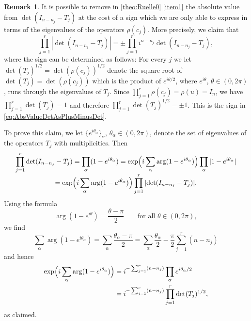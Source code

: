 \documentclass[10pt]{amsart}
\theoremstyle{plain}
\theoremstyle{definition}
\newtheorem{rmrk}[thm]{Remark}
\theoremstyle{remark}
\numberwithin{equation}{section}
\begin{document}
\begin{rmrk}\label{rmk:SignInM=0Formula}
It is possible to remove in \cref{theo:Ruelle0} \cref{item1} the absolute value from $\det(I_{n-n_j}-T_j)$ at the cost of a sign which we are only able to express in terms of the eigenvalues of the operators $\rho(c_j)$. More precisely, we claim that
\begin{equation}
\prod_{j=1}^r|{\det}(I_{n-n_j}-T_j)| = \pm\prod_{j=1}^r i^{n-n_j}\det(I_{n-n_j}-T_j),\label{eq:AbsValueDetAsPlusMinusDet}
\end{equation}
where the sign can be determined as follows: For every $j$ we let $\det(T_j)^{1/2}=\det(\rho(c_j))^{1/2}$ denote the square root of $\det(T_j)=\det(\rho(c_j))$ which is the product of $e^{i\theta/2}$, where $e^{i\theta}$, $\theta\in(0,2\pi)$, runs through the eigenvalues of $T_j$. Since $\prod_{j=1}^r\rho(c_j)=\rho(u)=I_n$, we have $\prod_{j=1}^r\det(T_j)=1$ and therefore $\prod_{j=1}^r\det(T_j)^{1/2}=\pm1$. This is the sign in \cref{eq:AbsValueDetAsPlusMinusDet}.

To prove this claim, we let $\{e^{i\theta_\alpha}\}_\alpha$, $\theta_\alpha\in(0,2\pi)$, denote the set of eigenvalues of the operators $T_j$ with multiplicities. Then\vspace*{-3pt}
\begin{multline*}
\prod_{j=1}^r\det(I_{n-n_j}-T_j) = \prod_\alpha(1-e^{i\theta_\alpha}) = \exp\Bigl(i\sum_\alpha\arg(1-e^{i\theta_\alpha})\Bigr)\prod_\alpha|1-e^{i\theta_\alpha}|\\[-3pt]
= \exp\Bigl(i\sum_\alpha\arg(1-e^{i\theta_\alpha})\Bigr)\prod_{j=1}^r|{\det}(I_{n-n_j}-T_j)|.
\end{multline*}
Using the formula\vspace*{-3pt}
\begin{equation}
\arg(1-e^{i\theta}) = \frac{\theta-\pi}{2} \qquad \mbox{for all }\theta\in(0,2\pi),\label{eq:FormulaForArgument1MinusZ}
\end{equation}
we find\vspace*{-3pt}
\[
\sum_\alpha\arg(1-e^{i\theta_\alpha}) = \sum_\alpha\frac{\theta_\alpha-\pi}{2} = \sum_\alpha\frac{\theta_\alpha}{2}-\frac{\pi}{2}\sum_{j=1}^r(n-n_j)
\]
and hence
\begin{align*}
\exp\Bigl(i\sum_\alpha\arg(1-e^{i\theta_\alpha})\Bigr) &= i^{-\sum_{j=1}^r(n-n_j)}\prod_\alpha e^{i\theta_\alpha/2}\\
&= i^{-\sum_{j=1}^r(n-n_j)}\prod_{j=1}^r \det(T_j)^{1/2},
\end{align*}
as claimed.
\end{rmrk}
\end{document}
